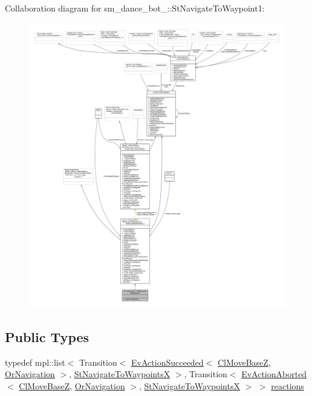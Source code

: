 Collaboration diagram for sm\+\_\+dance\+\_\+bot\+\_\+:\+:St\+Navigate\+To\+Waypoint1\+:
\nopagebreak
\begin{figure}[H]
\begin{center}
\leavevmode
\includegraphics[width=350pt]{structsm__dance__bot__2_1_1StNavigateToWaypoint1__coll__graph}
\end{center}
\end{figure}
\subsection*{Public Types}
\begin{DoxyCompactItemize}
\item 
typedef mpl\+::list$<$ Transition$<$ \hyperlink{structsmacc_1_1default__events_1_1EvActionSucceeded}{Ev\+Action\+Succeeded}$<$ \hyperlink{classcl__move__base__z_1_1ClMoveBaseZ}{Cl\+Move\+BaseZ}, \hyperlink{classsm__dance__bot__2_1_1OrNavigation}{Or\+Navigation} $>$, \hyperlink{structsm__dance__bot__2_1_1StNavigateToWaypointsX}{St\+Navigate\+To\+WaypointsX} $>$, Transition$<$ \hyperlink{structsmacc_1_1default__events_1_1EvActionAborted}{Ev\+Action\+Aborted}$<$ \hyperlink{classcl__move__base__z_1_1ClMoveBaseZ}{Cl\+Move\+BaseZ}, \hyperlink{classsm__dance__bot__2_1_1OrNavigation}{Or\+Navigation} $>$, \hyperlink{structsm__dance__bot__2_1_1StNavigateToWaypointsX}{St\+Navigate\+To\+WaypointsX} $>$ $>$ \hyperlink{structsm__dance__bot__2_1_1StNavigateToWaypoint1_aff49378c737221ccf57ba31064bd15a2}{reactions}
\end{DoxyCompactItemize}
